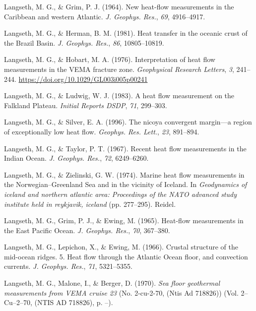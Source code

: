 \begin{CSLReferences}{1}{1}
\leavevmode{}%
Langseth, M. G., \& Grim, P. J. (1964). New heat-flow measurements in the {Caribbean and western Atlantic}. \emph{J. Geophys. Res.}, \emph{69}, 4916--4917.

\leavevmode{}%
Langseth, M. G., \& Herman, B. M. (1981). Heat transfer in the oceanic crust of the {Brazil Basin}. \emph{J. Geophys. Res.}, \emph{86}, 10805--10819.

\leavevmode{}%
Langseth, M. G., \& Hobart, M. A. (1976). Interpretation of heat flow measurements in the VEMA fracture zone. \emph{Geophysical Research Letters}, \emph{3}, 241--244. \url{https://doi.org/10.1029/GL003i005p00241}

\leavevmode{}%
Langseth, M. G., \& Ludwig, W. J. (1983). A heat flow measurement on the {Falkland Plateau}. \emph{Initial Reports DSDP}, \emph{71}, 299--303.

\leavevmode{}%
Langseth, M. G., \& Silver, E. A. (1996). The nicoya convergent margin---a region of exceptionally low heat flow. \emph{Geophys. Res. Lett.}, \emph{23}, 891--894.

\leavevmode{}%
Langseth, M. G., \& Taylor, P. T. (1967). Recent heat flow measurements in the {Indian Ocean}. \emph{J. Geophys. Res.}, \emph{72}, 6249--6260.

\leavevmode{}%
Langseth, M. G., \& Zielinski, G. W. (1974). Marine heat flow measurements in the {Norwegian--Greenland Sea} and in the vicinity of {Iceland}. In \emph{Geodynamics of iceland and northern atlantic area: Proceedings of the NATO advanced study institute held in reykjavik, iceland} (pp. 277--295). Reidel.

\leavevmode{}%
Langseth, M. G., Grim, P. J., \& Ewing, M. (1965). Heat-flow measurements in the {East Pacific Ocean}. \emph{J. Geophys. Res.}, \emph{70}, 367--380.

\leavevmode{}%
Langseth, M. G., Lepichon, X., \& Ewing, M. (1966). Crustal structure of the mid-ocean ridges. {5. Heat flow through the Atlantic Ocean floor, and convection currents}. \emph{J. Geophys. Res.}, \emph{71}, 5321--5355.

\leavevmode{}%
Langseth, M. G., Malone, I., \& Berger, D. (1970). \emph{Sea floor geothermal measurements from VEMA cruise 23} (No. 2-cu-2-70, (Ntis Ad 718826)) (Vol. 2--Cu--2--70, (NTIS AD 718826), p. --).


\end{CSLReferences}
